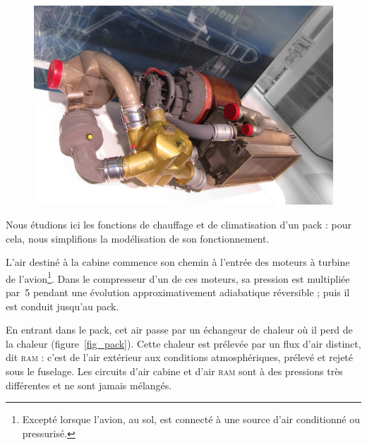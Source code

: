 	\begin{figure}
		\begin{center}
			\includegraphics[height=.35\textwidth]{images/liebherr_pack.jpg}
		\end{center}
		\label{fig_pack_c919}
	\end{figure}
	

	Nous étudions ici les fonctions de chauffage et de climatisation d’un pack : pour cela, nous simplifions la modélisation de son fonctionnement.
	
		L’air destiné à la cabine commence son chemin à l’entrée des moteurs à turbine de l’avion\footnote{Excepté lorsque l’avion, au sol, est connecté à une source d’air conditionné ou pressurisé.}. Dans le compresseur d’un de ces moteurs, sa pression est multipliée par~\num{5} pendant une évolution approximativement adiabatique réversible ; puis il est conduit jusqu’au pack.
	
		En entrant dans le pack, cet air passe par un échangeur de chaleur où il perd de la chaleur (figure~\ref{fig_pack}). Cette chaleur est prélevée par un flux d’air distinct, dit \textsc{ram} : c’est de l’air extérieur aux conditions atmosphériques, prélevé et rejeté sous le fuselage. Les circuits d’air cabine et d’air \textsc{ram} sont à des pressions très différentes et ne sont jamais mélangés.
	
